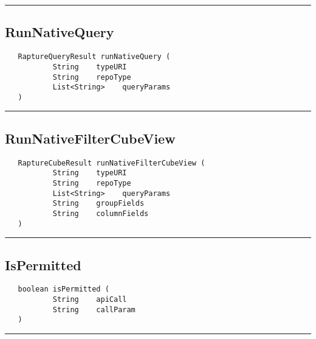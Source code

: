 \rule{15cm}{2pt}
\subsection{RunNativeQuery}
\label{Api:RunNativeQuery}
\begin{verbatim}
   RaptureQueryResult runNativeQuery (
           String    typeURI
           String    repoType
           List<String>    queryParams
   )
\end{verbatim}



\rule{15cm}{2pt}
\subsection{RunNativeFilterCubeView}
\label{Api:RunNativeFilterCubeView}
\begin{verbatim}
   RaptureCubeResult runNativeFilterCubeView (
           String    typeURI
           String    repoType
           List<String>    queryParams
           String    groupFields
           String    columnFields
   )
\end{verbatim}



\rule{15cm}{2pt}
\subsection{IsPermitted}
\label{Api:IsPermitted}
\begin{verbatim}
   boolean isPermitted (
           String    apiCall
           String    callParam
   )
\end{verbatim}



\rule{15cm}{2pt}
